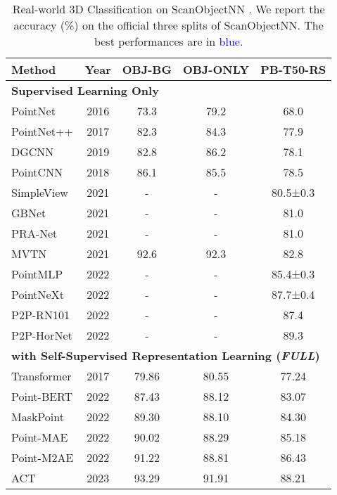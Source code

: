 \documentclass[sigconf, screen]{acmart}
\begin{document}
\begin{table}
\caption{
 Real-world 3D Classification on ScanObjectNN \cite{uy2019revisiting}. We report the accuracy (\%) on the official three splits of ScanObjectNN. The best performances are in \textcolor{blue}{blue}.
}
\centering
\setlength{\tabcolsep}{1.1mm}
\begin{tabular}{@{}lcccc}
\toprule[1pt]
Method & Year &OBJ-BG  &  OBJ-ONLY & PB-T50-RS
\\
\midrule[0.5pt]
\multicolumn{5}{l}{
\hspace{-0.5em}\textbf{Supervised Learning Only}}
\\
PointNet \cite{qi2017pointnet} &2016&73.3& 79.2& 68.0 \\
PointNet++ \cite{qi2017pointnet++} &2017&82.3& 84.3& 77.9  \\
DGCNN \cite{wang2019dynamic} &2019&82.8& 86.2&  78.1 \\
PointCNN \cite{li2018pointcnn} &2018& 86.1 &85.5 &78.5  \\
SimpleView \cite{goyal2021revisiting}&2021 &- &- &80.5±0.3  \\
GBNet \cite{qiu2021geometric} &2021&-& -& 81.0  \\
PRA-Net \cite{cheng2021net}&2021 &-& -& 81.0  \\
MVTN \cite{hamdi2021mvtn}&2021 & 92.6 &92.3 &82.8  \\
PointMLP \cite{ma2022rethinking} &2022&-& -& 85.4±0.3  \\
PointNeXt \cite{qian2022pointnext} &2022&-& -& 87.7±0.4  \\
P2P-RN101 \cite{wang2022p2p} &2022&-& -& 87.4 \\
P2P-HorNet \cite{wang2022p2p} &2022&-& -&  89.3  \\
\midrule[0.5pt]
\multicolumn{5}{l}{
\hspace{-0.5em}\textbf{with Self-Supervised Representation Learning (\textit{FULL})}}
\\
Transformer \cite{vaswani2017attention} &2017&79.86 &80.55 &77.24 \\
Point-BERT \cite{yu2022point} &2022&87.43 &88.12 &83.07  \\
MaskPoint \cite{liu2022masked} &2022&89.30 &88.10 &84.30 \\
Point-MAE \cite{pang2022masked} &2022 &90.02 &88.29 &85.18  \\
Point-M2AE \cite{zhang2022masked} &2022&91.22 &88.81 &86.43 \\
ACT \cite{dong2022autoencoders} &2023&93.29 &91.91 &88.21 \\

\end{tabular}
\end{table}
\end{document}

